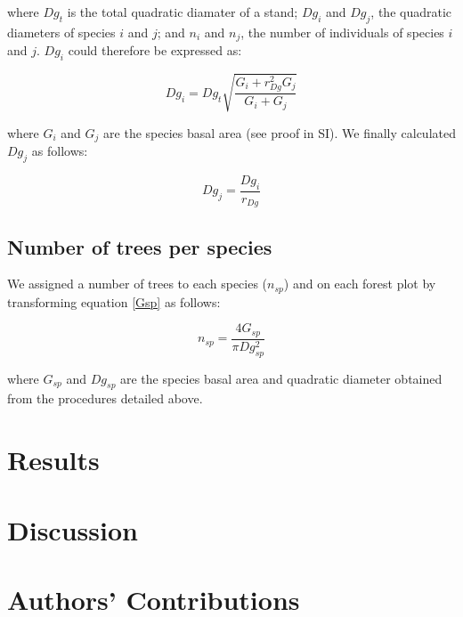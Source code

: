 \documentclass[a4paper]{article}
\begin{document}
\begin{enumerate}
  where $Dg_t$ is the total quadratic diamater of a stand; $Dg_i$ and $Dg_j$, the quadratic diameters of species $i$ and $j$; and $n_i$ and $n_j$, the number of individuals of species $i$ and $j$. $Dg_i$ could therefore be expressed as:

  \begin{equation}\label{}
    Dg_i = Dg_t\sqrt{\frac{G_i + r_{Dg}^2G_j}{G_i + G_j}}
  \end{equation}

  where $G_i$ and $G_j$ are the species basal area (see proof in SI). We finally calculated $Dg_j$ as follows:

  \begin{equation}\label{}
    Dg_j = \frac{Dg_i}{r_{Dg}}
  \end{equation}

\end{enumerate}


\subsection*{Number of trees per species}

\noindent We assigned a number of trees to each species ($n_{sp}$) and on each forest plot by transforming equation \ref{Gsp} as follows:

\begin{equation}\label{}
  n_{sp} = \frac{4G_{sp}}{\pi Dg_{sp}^2}
\end{equation}

\noindent where $G_{sp}$ and $Dg_{sp}$ are the species basal area and quadratic diameter obtained from the procedures detailed above.

\section*{Results}

\section*{Discussion}


\section*{Authors' Contributions}
\end{document}
